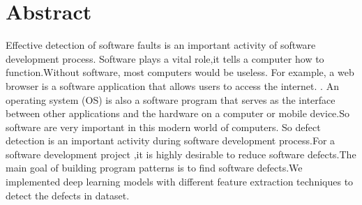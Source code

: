 \newpage
\chapter*{\centering Abstract}
{
Effective detection of software faults is an important activity of software development process. Software plays a vital role,it  tells a computer how to function.Without software, most computers would be useless. For example, a web browser is a software application that allows users to access the internet. . An operating system (OS) is also  a software program that serves as the interface between other applications and the hardware on a computer or mobile device.So software are very important in this modern world of computers.
So defect detection is an important activity during software development process.For a software development  project ,it is  highly desirable to reduce software defects.The main goal of building program patterns is to find software defects.We implemented deep learning models with different feature extraction techniques to detect the defects in dataset.
}

 